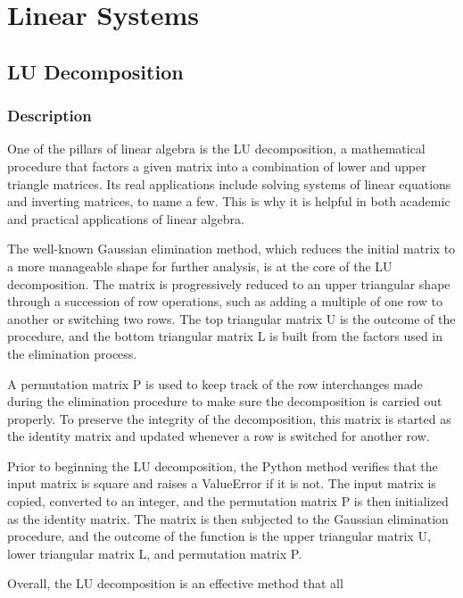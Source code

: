 \section{Linear Systems}
\subsection{LU Decomposition}
\subsubsection{Description}
One of the pillars of linear algebra is the LU decomposition, a mathematical procedure that factors a given matrix into a combination of lower and upper triangle matrices. Its real applications include solving systems of linear equations and inverting matrices, to name a few. This is why it is helpful in both academic and practical applications of linear algebra.

The well-known Gaussian elimination method, which reduces the initial matrix to a more manageable shape for further analysis, is at the core of the LU decomposition. The matrix is progressively reduced to an upper triangular shape through a succession of row operations, such as adding a multiple of one row to another or switching two rows. The top triangular matrix U is the outcome of the procedure, and the bottom triangular matrix L is built from the factors used in the elimination process.

A permutation matrix P is used to keep track of the row interchanges made during the elimination procedure to make sure the decomposition is carried out properly. To preserve the integrity of the decomposition, this matrix is started as the identity matrix and updated whenever a row is switched for another row.

Prior to beginning the LU decomposition, the Python method verifies that the input matrix is square and raises a ValueError if it is not. The input matrix is copied, converted to an integer, and the permutation matrix P is then initialized as the identity matrix. The matrix is then subjected to the Gaussian elimination procedure, and the outcome of the function is the upper triangular matrix U, lower triangular matrix L, and permutation matrix P.

Overall, the LU decomposition is an effective method that all

